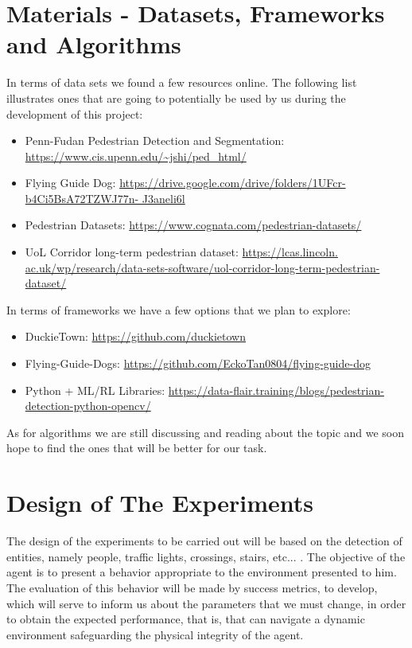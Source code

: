 \documentclass[letterpaper,10pt]{article}
\begin{document}
\section{Materials - Datasets, Frameworks and Algorithms} 

In terms of data sets we found a few resources online. The following list
illustrates ones that are going to potentially be used by us during the 
development of this project:
\begin{itemize}
  \item Penn-Fudan Pedestrian Detection and Segmentation: 
    \url{https://www.cis.upenn.edu/~jshi/ped_html/}
  \item Flying Guide Dog: 
    \url{https://drive.google.com/drive/folders/1UFcr-b4Ci5BsA72TZWJ77n-
    J3aneli6l}
  \item Pedestrian Datasets: \url{https://www.cognata.com/pedestrian-datasets/}
  \item UoL Corridor long-term pedestrian dataset: \url{https://lcas.lincoln.
    ac.uk/wp/research/data-sets-software/uol-corridor-long-term-pedestrian-
    dataset/}
\end{itemize}
In terms of frameworks we have a few options that we plan to explore: 
\begin{itemize}
  \item DuckieTown: \url{https://github.com/duckietown} 
  \item Flying-Guide-Dogs: 
    \url{https://github.com/EckoTan0804/flying-guide-dog}
  \item Python + ML/RL Libraries: 
    \url{https://data-flair.training/blogs/pedestrian-detection-python-opencv/}
\end{itemize}
As for algorithms we are still discussing and reading about the topic and we
soon hope to find the ones that will be better for our task.

\section{Design of The Experiments}

The design of the experiments to be carried out will be based on the 
detection of entities, namely people, traffic lights, crossings, 
stairs, etc... . The objective of the agent is to present a behavior 
appropriate to the environment presented to him. The evaluation of this 
behavior will be made by success metrics, to develop, which will serve 
to inform us about the parameters that we must change, in order to obtain 
the expected performance, that is, that can navigate a dynamic environment 
safeguarding the physical integrity of the agent.
\end{document}
